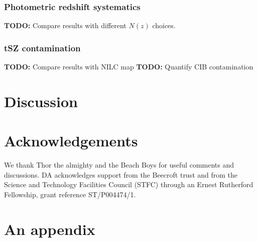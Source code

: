 \documentclass[useAMS,usenatbib]{mn2e}
\newcommand{\TODO}[1]{{\bf TODO:} #1}
\begin{document}
    \subsubsection{Photometric redshift systematics}\label{sssec:results.syst.pz}
      \TODO{Compare results with different $N(z)$ choices.}
    \subsubsection{tSZ contamination}\label{sssec:results.syst.y}
      \TODO{Compare results with NILC map}
      \TODO{Quantify CIB contamination}

\section{Discussion}\label{sec:discussion}
  \lipsum[2]

\section*{Acknowledgements}
  We thank Thor the almighty and the Beach Boys for useful comments and discussions. DA acknowledges support from the Beecroft trust and from the Science and Technology Facilities Council (STFC) through an Ernest Rutherford Fellowship, grant reference ST/P004474/1.
  
\setlength{\bibhang}{2.0em}
\setlength{}


\appendix
\section{An appendix}\label{app:app}
  \lipsum[3]
\end{document}
